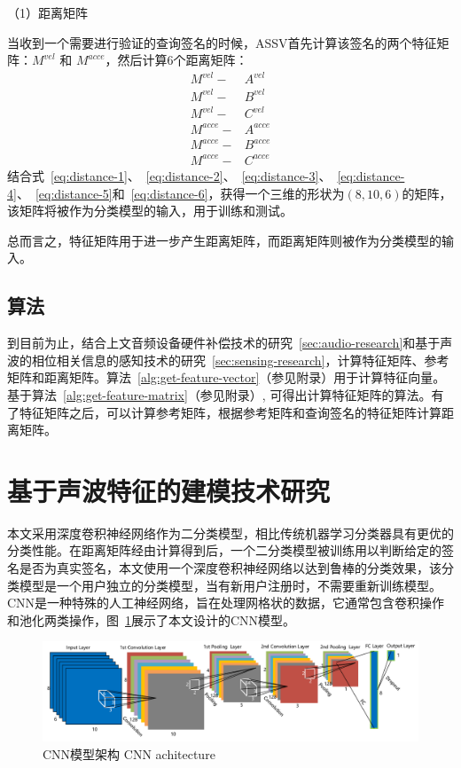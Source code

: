 （1）距离矩阵

当收到一个需要进行验证的查询签名的时候，ASSV首先计算该签名的两个特征矩阵：$M^{vel}$ 和 $M^{acce}$，然后计算6个距离矩阵：
\begin{align}
M^{vel} -& A^{vel}  \label{eq:distance-1} \\
M^{vel} -& B^{vel}  \label{eq:distance-2} \\
M^{vel} -& C^{vel}  \label{eq:distance-3} \\
M^{acce} -& A^{acce} \label{eq:distance-4} \\
M^{acce} -& B^{acce} \label{eq:distance-5} \\
M^{acce} -& C^{acce} \label{eq:distance-6}
\end{align}
结合式~\ref{eq:distance-1}、~\ref{eq:distance-2}、~\ref{eq:distance-3}、~\ref{eq:distance-4}、~\ref{eq:distance-5}和~\ref{eq:distance-6}，获得一个三维的形状为$(8,10,6)$的矩阵，该矩阵将被作为分类模型的输入，用于训练和测试。

总而言之，特征矩阵用于进一步产生距离矩阵，而距离矩阵则被作为分类模型的输入。

\subsection{算法}
到目前为止，结合上文音频设备硬件补偿技术的研究~\ref{sec:audio-research}和基于声波的相位相关信息的感知技术的研究~\ref{sec:sensing-research}，计算特征矩阵、参考矩阵和距离矩阵。算法~\ref{alg:get-feature-vector}（参见附录）用于计算特征向量。
基于算法~\ref{alg:get-feature-matrix}（参见附录）,
可得出计算特征矩阵的算法。有了特征矩阵之后，可以计算参考矩阵，根据参考矩阵和查询签名的特征矩阵计算距离矩阵。

\section{基于声波特征的建模技术研究}
本文采用深度卷积神经网络作为二分类模型，相比传统机器学习分类器具有更优的分类性能。在距离矩阵经由计算得到后，一个二分类模型被训练用以判断给定的签名是否为真实签名，本文使用一个深度卷积神经网络以达到鲁棒的分类效果，该分类模型是一个用户独立的分类模型，当有新用户注册时，不需要重新训练模型。CNN是一种特殊的人工神经网络，旨在处理网格状的数据，它通常包含卷积操作和池化两类操作，图~\ref{fig:cnn-architecture}展示了本文设计的CNN模型。
\begin{figure}[!htp]
  \centering
  \includegraphics[width=\textwidth]{figure/cnn-architecture.pdf}
  \bicaption
    {CNN模型架构}
    {CNN achitecture}
  \label{fig:cnn-architecture}
\end{figure}

